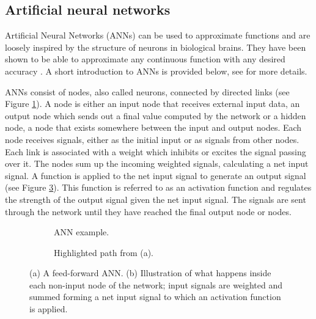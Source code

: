 \subsection{Artificial neural networks}
Artificial Neural Networks (ANNs) can be used to approximate functions and are loosely inspired by the structure
of neurons in biological brains.
They have been shown to be able to approximate any continuous function with any desired accuracy \cite{universality_formal,universality_informal}.
A short introduction to ANNs is provided below, see \cite{compint} for more details.

ANNs consist of nodes, also called neurons, connected by directed links (see Figure \ref{feedforward}).
A node is either an input node that receives external input data, an output node which sends out a final value computed
by the network or a hidden node, a node that exists somewhere between the input and output nodes. Each node receives signals, either
as the initial input or as signals from other nodes. Each link is associated with a weight which inhibits or excites the signal
passing over it. The nodes sum up the incoming weighted signals, calculating a net input signal. A function is applied to the net input
signal to generate an output signal (see Figure \ref{neuron}). This function is referred to as an activation function and regulates the strength of the output
signal given the net input signal. The signals are sent through the network until they have reached the final output node or nodes.


\begin{figure}[htb]
    \begin{mdframed}
        \begin{subfigure}[b]{0.5\textwidth}
            \centering
            \resizebox{0.7\textwidth}{!}{}
            \caption{ANN example.}
            \label{feedforward}
        \end{subfigure}
        \begin{subfigure}[b]{0.5\textwidth}
            \centering
            \resizebox{0.9\textwidth}{!}{}
            \caption{Highlighted path from (a).}
            \label{neuron}
        \end{subfigure}
    \end{mdframed}
    \caption{(a) A feed-forward ANN. (b) Illustration of what happens inside each non-input node of the network; input
                 signals are weighted and summed forming a net input signal to which an activation function is applied.}
\end{figure}

